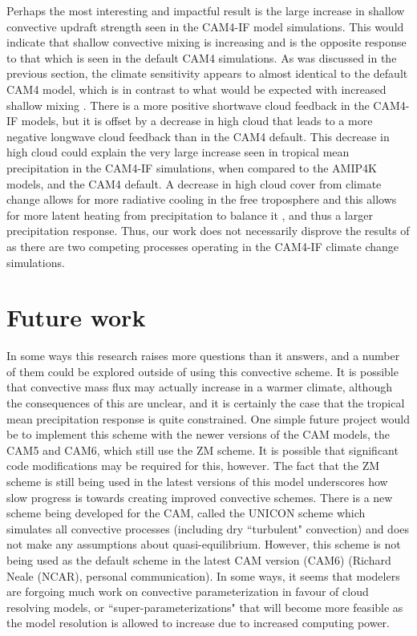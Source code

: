 \documentclass[letterpaper,12pt,titlepage,oneside,final]{book}
\begin{document}
Perhaps the most interesting and impactful result is the large increase in shallow convective updraft strength seen in the CAM4-IF model simulations. This would indicate that shallow convective mixing is increasing and is the opposite response to that which is seen in the default CAM4 simulations. As was discussed in the previous section, the climate sensitivity appears to almost identical to the default CAM4 model, which is in contrast to what would be expected with increased shallow mixing \citep{sherwood_spread_2014}. There is a more positive shortwave cloud feedback in the CAM4-IF models, but it is offset by a decrease in high cloud that leads to a more negative longwave cloud feedback than in the CAM4 default. This decrease in high cloud could explain the very large increase seen in tropical mean precipitation in the CAM4-IF simulations, when compared to the AMIP4K models, and the CAM4 default. A decrease in high cloud cover from climate change allows for more radiative cooling in the free troposphere and this allows for more latent heating from precipitation to balance it \citep{su_tightening_2017}, and thus a larger precipitation response. Thus, our work does not necessarily disprove the results of \citep{sherwood_spread_2014} as there are two competing processes operating in the CAM4-IF climate change simulations.


\section{Future work}
In some ways this research raises more questions than it answers, and a number of them could be explored outside of using this convective scheme. It is possible that convective mass flux may actually increase in a warmer climate, although the consequences of this are unclear, and it is certainly the case that the tropical mean precipitation response is quite constrained. One simple future project would be to implement this scheme with the newer versions of the CAM models, the CAM5 and CAM6, which still use the ZM scheme. It is possible that significant code modifications may be required for this, however. The fact that the ZM scheme is still being used in the latest versions of this model underscores how slow progress is towards creating improved convective schemes. There is a new scheme being developed for the CAM, called the UNICON scheme \citep{park_unified_2014,park_unified_2014-1} which simulates all convective processes (including dry ``turbulent" convection) and does not make any assumptions about quasi-equilibrium. However, this scheme is not being used as the default scheme in the latest CAM version (CAM6) (Richard Neale (NCAR), personal communication). In some ways, it seems that modelers are forgoing much work on convective parameterization in favour of cloud resolving models, or ``super-parameterizations" \citep{li_super-parameterization:_2012} that will become more feasible as the model resolution is allowed to increase due to increased computing power.
\end{document}
